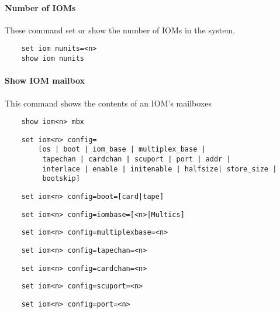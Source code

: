 \documentclass[notitlepage]{report}
\begin{document}
\paragraph{Number of IOMs}
These command set or show the number of IOMs in the system.

\begin{lstlisting}
	set iom nunits=<n>
	show iom nunits
\end{lstlisting}

\paragraph{Show IOM mailbox}
This command shows the contents of an IOM's mailboxes

\begin{lstlisting}
	show iom<n> mbx
\end{lstlisting}

\begin{lstlisting}
	set iom<n> config=
	    [os | boot | iom_base | multiplex_base |
	     tapechan | cardchan | scuport | port | addr |
	     interlace | enable | initenable | halfsize| store_size |
	     bootskip]
\end{lstlisting}

\begin{lstlisting}
	set iom<n> config=boot=[card|tape]
\end{lstlisting}

\begin{lstlisting}
	set iom<n> config=iombase=[<n>|Multics]
\end{lstlisting}

\begin{lstlisting}
	set iom<n> config=multiplexbase=<n>
\end{lstlisting}

\begin{lstlisting}
	set iom<n> config=tapechan=<n>
\end{lstlisting}

\begin{lstlisting}
	set iom<n> config=cardchan=<n>
\end{lstlisting}

\begin{lstlisting}
	set iom<n> config=scuport=<n>
\end{lstlisting}

\begin{lstlisting}
	set iom<n> config=port=<n>
\end{lstlisting}
\end{document}
